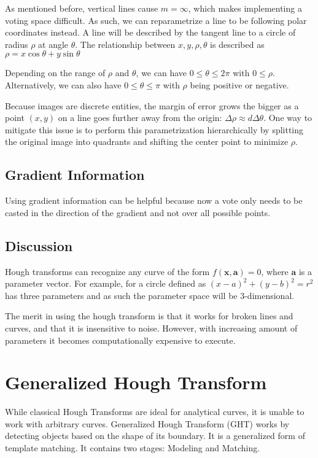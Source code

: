 \documentclass{article}
\begin{document}
\begin{multicols}{3}
As mentioned before, vertical lines cause $m = \infty$, which makes implementing a voting space difficult. As such, we can reparametrize a line to be following polar coordinates instead. A line will be described by the tangent line to a circle of radius $\rho$ at angle $\theta$. The relationship between $x, y, \rho, \theta$ is described as $\rho = x\cos\theta+y\sin\theta$

Depending on the range of $\rho$ and $\theta$, we can have $0 \leq \theta \leq 2\pi$ with $0 \leq \rho$. Alternatively, we can also have $0 \leq \theta \leq \pi$ with $\rho$ being positive or negative.

Because images are discrete entities, the margin of error grows the bigger as a point $(x,y)$ on a line goes further away from the origin: $\Delta \rho \approx d \Delta \theta$. One way to mitigate this issue is to perform this parametrization hierarchically by splitting the original image into quadrants and shifting the center point to minimize $\rho$.

\subsection{Gradient Information}

Using gradient information can be helpful because now a vote only needs to be casted in the direction of the gradient and not over all possible points.

\subsection{Discussion}

Hough transforms can recognize any curve of the form $f(\mathbf{x}, \mathbf{a}) = 0$, where $\mathbf{a}$ is a parameter vector. For example, for a circle defined as $(x-a)^2 + (y-b)^2 = r^2$ has three parameters and as such the parameter space will be 3-dimensional.

The merit in using the hough transform is that it works for broken lines and curves, and that it is insensitive to noise. However, with increasing amount of parameters it becomes computationally expensive to execute.

\section{Generalized Hough Transform}

While classical Hough Transforms are ideal for analytical curves, it is unable to work with arbitrary curves. Generalized Hough Transform (GHT) works by detecting objects based on the shape of its boundary. It is a generalized form of template matching. It contains two stages: Modeling and Matching.


\end{multicols}
\end{document}
